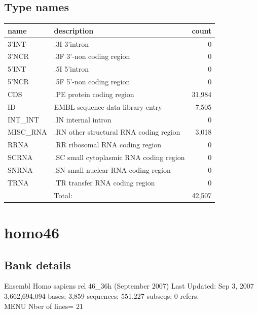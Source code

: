 \documentclass{article}
\begin{document}
\begin{Schunk}
\subsection{Type names}
\noindent\begin{tabular}{llr}
\hline \hline
name & description & count \\
\hline
3'INT  &  .3I 3'intron  &  0 \\
3'NCR  &  .3F  3'-non coding region  &  0 \\
5'INT  &  .5I 5'intron  &  0 \\
5'NCR  &  .5F  5'-non coding region  &  0 \\
CDS  &  .PE protein coding region  &  31,984 \\
ID  &  EMBL sequence data library entry  &  7,505 \\
INT\_INT  &  .IN  internal intron  &  0 \\
MISC\_RNA  &  .RN other structural RNA coding region  &  3,018 \\
RRNA  &  .RR ribosomal RNA coding region  &  0 \\
SCRNA  &  .SC small cytoplasmic RNA coding region  &  0 \\
SNRNA  &  .SN small nuclear RNA coding region  &  0 \\
TRNA  &  .TR transfer RNA coding region  &  0 \\
\hline
 & Total: & 42,507 \\
\hline \hline
\end{tabular}

\section{ homo46 }
\subsection{Bank details}
Ensembl Homo sapiens rel 46\_36h (September 2007) Last Updated: Sep  3, 2007\\
3,662,694,094 bases; 3,859 sequences; 551,227 subseqs; 0 refers.\\
MENU Nber of lines= 21


\end{Schunk}
\end{document}
